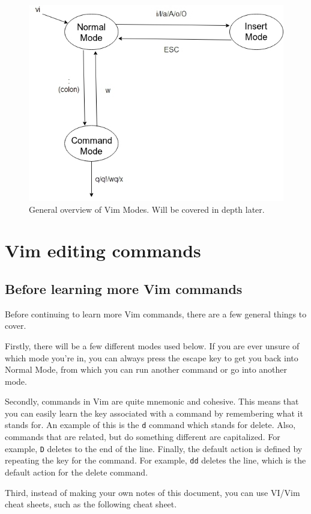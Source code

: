 \documentclass[11pt]{article}
\begin{document}
\begin{figure}[htbp]
\centering
\includegraphics[width=.9\linewidth]{./modes.jpg}
\caption{\label{fig:org8c828b4}
General overview of Vim Modes. Will be covered in depth later.}
\end{figure}
\section{Vim editing commands}
\label{sec:org6d1b628}
\subsection{Before learning more Vim commands}
\label{sec:orgb0200da}
Before continuing to learn more Vim commands, there are a few general things
to cover. 

Firstly, there will be a few different modes used below. If you are
ever unsure of which mode you're in, you can always press the escape key to 
get you back into Normal Mode, from which you can run another command or 
go into another mode.

Secondly, commands in Vim are quite mnemonic and cohesive. This means that you
can easily learn the key associated with a command by remembering what it stands
for. An example of this is the \texttt{d} command which stands for delete. Also,
commands that are related, but do something different are capitalized. For
example, \texttt{D} deletes to the end of the line. Finally, the default action is defined by
repeating the key for the command. For example, \texttt{dd} deletes the line, which is
the default action for the delete command. 

Third, instead of making your own notes of this document, you can use VI/Vim 
cheat sheets, such as the following cheat sheet.
\end{document}
